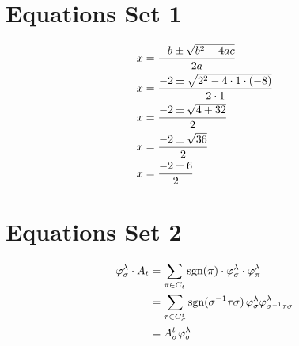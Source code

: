 \documentclass{article}
\begin{document}
\section*{Equations Set 1}

\begin{align}
x &= \frac{-b \pm \sqrt{b^2 - 4ac}}{2a} \notag \\
x &= \frac{-2 \pm \sqrt{2^2 - 4 \cdot 1 \cdot (-8)}}{2 \cdot 1} \notag \\
x &= \frac{-2 \pm \sqrt{4 + 32}}{2} \notag \\
x &= \frac{-2 \pm \sqrt{36}}{2} \notag \\
x &= \frac{-2 \pm 6}{2} \notag
\end{align}

\section*{Equations Set 2}

\begin{align}
\varphi_{\sigma}^{\lambda} \cdot A_{t} &= \sum_{\pi \in C_{t}} \text{sgn}(\pi) \cdot \varphi_{\sigma}^{\lambda} \cdot \varphi_{\pi}^{\lambda} \notag \\
&= \sum_{\tau \in C_{\sigma}^{t}} \text{sgn}(\sigma^{-1} \tau \sigma)\, \varphi_{\sigma}^{\lambda} \varphi_{\sigma^{-1} \tau \sigma}^{\lambda} \notag \\
&= A_{\sigma}^{t} \varphi_{\sigma}^{\lambda} \notag
\end{align}
\end{document}
